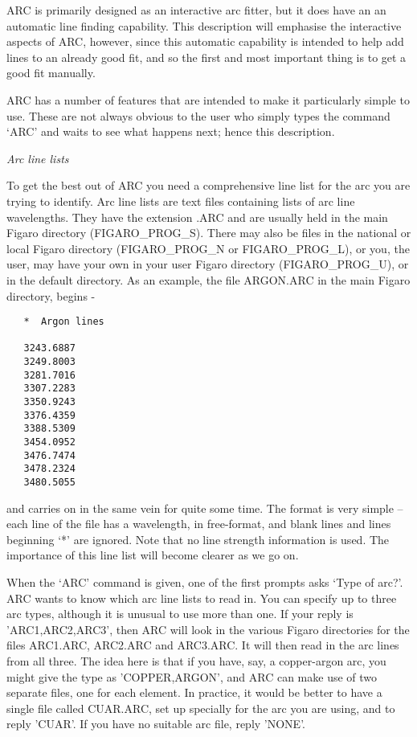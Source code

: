 ARC is primarily designed as an interactive arc fitter, but it
does have an an automatic line finding capability.  This description will
emphasise the interactive aspects of ARC, however, since this 
automatic capability is intended to help add lines to an already good fit,
and so the first and most important thing is to get a good fit manually.

ARC has a number
of features that are intended to make it particularly simple to use.
These are not always obvious to the user who simply types the command
`ARC' and waits to see what happens next; hence this description.


\goodbreak
\vspace{12pt}
{\it Arc line lists}

To get the best out of ARC you need a comprehensive line list for
the arc you are trying to identify.  Arc line lists are text files containing
lists of arc line wavelengths.  They have the extension .ARC and are
usually held in the main Figaro directory (FIGARO\_PROG\_S).  There may
also be files in the national or local Figaro directory (FIGARO\_PROG\_N or
FIGARO\_PROG\_L), or
you, the user, may have your own in your user Figaro directory 
(FIGARO\_PROG\_U), or in the default directory.  As an example, the
file ARGON.ARC in the main Figaro directory, begins -

\goodbreak
\begin{verbatim}
   *  Argon lines

   3243.6887
   3249.8003
   3281.7016
   3307.2283
   3350.9243
   3376.4359
   3388.5309
   3454.0952
   3476.7474
   3478.2324
   3480.5055
\end{verbatim}

and carries on in the same vein for quite some time.  The format is very
simple -- each line of the file has a wavelength, in free-format, and blank
lines and lines beginning `*' are ignored.  Note that no line strength
information is used. The importance of this line list
will become clearer as we go on.

When the `ARC' command is given, one of the first prompts asks
`Type of arc?'.  ARC wants to know which arc line lists to read in.
You can specify up to three arc types, although it is unusual to use
more than one.  If your reply is 'ARC1,ARC2,ARC3', then ARC will look
in the various Figaro directories for the files ARC1.ARC, ARC2.ARC and 
ARC3.ARC.  It will then read in the arc lines from all three.  The idea
here is that if you have, say, a copper-argon arc, you might give the
type as 'COPPER,ARGON', and ARC can make use of two separate files, one
for each element.  In practice, it would be better to have a single file
called CUAR.ARC, set up specially for the arc you are using, and to
reply 'CUAR'.  If you have no suitable arc file, reply 'NONE'.


